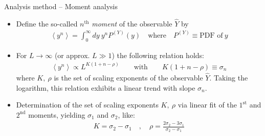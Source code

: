 \documentclass[xcolor=dvipsnames]{beamer}
\newcommand{\myitemsep}{\setlength\itemsep{0.33cm}}
\begin{document}
    \begin{frame}{Analysis method -- Moment analysis}
        \begin{itemize}
            \myitemsep
            \item {Define the so-called $n^{\mathrm{th}}$ \textit{moment} of the observable $\hat{Y}$ by
                \begin{align*}
                \left\langle y^n \right\rangle = \int_{0}^{\infty} dy\ y^n P^{(Y)}(y) \quad \text{where} \quad P^{(Y)}\equiv \text{PDF of}\ y
                \end{align*}
            }
            \item {For $L \to \infty$ (or approx. $L\gg 1$) the following relation holds:
                \begin{align*}
                \left\langle y^n \right\rangle \propto L^{K\left(1 + n - \rho \right)} \qquad \text{with}
                                                                \qquad K\left(1 + n - \rho \right) \equiv \sigma_n 
                \end{align*}
                where $K,\ \rho$ is the set of scaling exponents of the observable $\hat{Y}$. Taking the logarithm,
                this relation exhibits a linear trend with slope $\sigma_n$.
            }
            \item {Determination of the set of scaling exponents $K,\ \rho$ via linear fit of the $1^{\text{st}}$ and $2^{\text{nd}}$ moments, yielding $\sigma_1$ and $\sigma_2$, like:
                \begin{align*}
                K = \sigma_2 - \sigma_1 \quad , \quad \rho = \frac{2\sigma_2 - 3\sigma_1}{\sigma_2 - \sigma_1} 
                \end{align*} 
            }
        \end{itemize}
    \end{frame}
    
\end{document}

